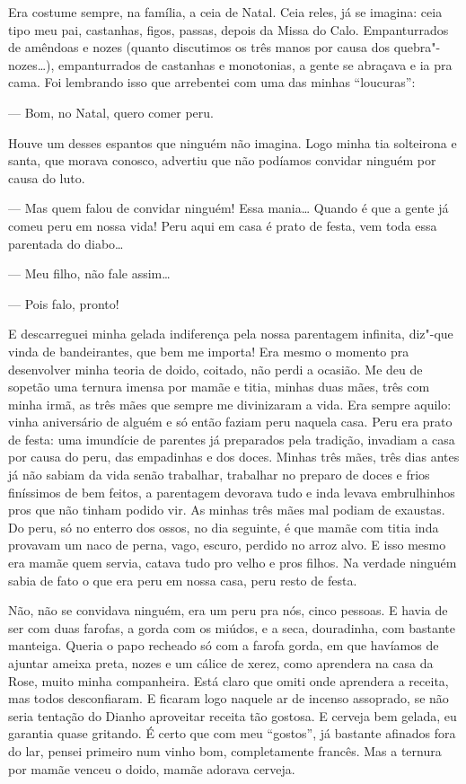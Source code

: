 Era costume sempre, na família, a ceia de Natal. Ceia reles, já se
imagina: ceia tipo meu pai, castanhas, figos, passas, depois da Missa do
Calo. Empanturrados de amêndoas e nozes (quanto discutimos os três manos
por causa dos quebra"-nozes\ldots{}), empanturrados de castanhas e monotonias,
a gente se abraçava e ia pra cama. Foi lembrando isso que arrebentei com
uma das minhas ``loucuras'':

--- Bom, no Natal, quero comer peru.

Houve um desses espantos que ninguém não imagina. Logo minha tia
solteirona e santa, que morava conosco, advertiu que não podíamos
convidar ninguém por causa do luto.

--- Mas quem falou de convidar ninguém! Essa mania\ldots{} Quando é que a
gente já comeu peru em nossa vida! Peru aqui em casa é prato de festa,
vem toda essa parentada do diabo\ldots{}

--- Meu filho, não fale assim\ldots{}

--- Pois falo, pronto!

E descarreguei minha gelada indiferença pela nossa parentagem infinita,
diz"-que vinda de bandeirantes, que bem me importa! Era mesmo o momento
pra desenvolver minha teoria de doido, coitado, não perdi a ocasião. Me
deu de sopetão uma ternura imensa por mamãe e titia, minhas duas mães,
três com minha irmã, as três mães que sempre me divinizaram a vida. Era
sempre aquilo: vinha aniversário de alguém e só então faziam peru
naquela casa. Peru era prato de festa: uma imundície de parentes já
preparados pela tradição, invadiam a casa por causa do peru, das
empadinhas e dos doces. Minhas três mães, três dias antes já não sabiam
da vida senão trabalhar, trabalhar no preparo de doces e frios
finíssimos de bem feitos, a parentagem devorava tudo e inda levava
embrulhinhos pros que não tinham podido vir. As minhas três mães mal
podiam de exaustas. Do peru, só no enterro dos ossos, no dia seguinte, é
que mamãe com titia inda provavam um naco de perna, vago, escuro,
perdido no arroz alvo. E isso mesmo era mamãe quem servia, catava tudo
pro velho e pros filhos. Na verdade ninguém sabia de fato o que era peru
em nossa casa, peru resto de festa.

Não, não se convidava ninguém, era um peru pra nós, cinco pessoas. E
havia de ser com duas farofas, a gorda com os miúdos, e a seca,
douradinha, com bastante manteiga. Queria o papo recheado só com a
farofa gorda, em que havíamos de ajuntar ameixa preta, nozes e um cálice
de xerez, como aprendera na casa da Rose, muito minha companheira. Está
claro que omiti onde aprendera a receita, mas todos desconfiaram. E
ficaram logo naquele ar de incenso assoprado, se não seria tentação do
Dianho aproveitar receita tão gostosa. E cerveja bem gelada, eu garantia
quase gritando. É certo que com meu ``gostos'', já bastante afinados
fora do lar, pensei primeiro num vinho bom, completamente francês. Mas a
ternura por mamãe venceu o doido, mamãe adorava cerveja.

